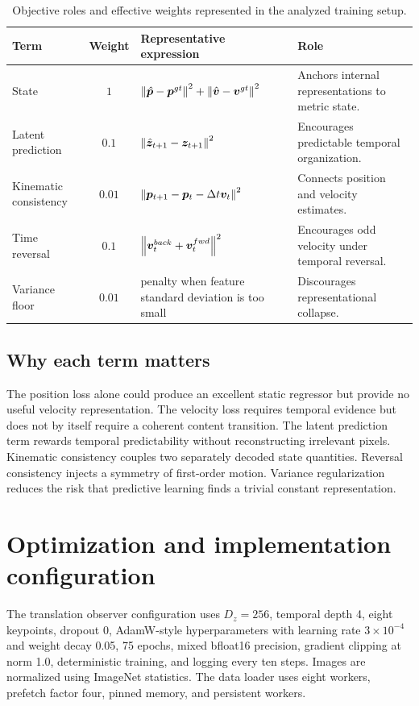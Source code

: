 \documentclass[11pt,a4paper]{article}
\begin{document}
\begin{table}\centering
\caption{Objective roles and effective weights represented in the analyzed training setup.}\label{tab:losses}
\begin{tabularx}{\textwidth}{lclX}\toprule
Term & Weight & Representative expression & Role \\\midrule
State & $1$ & $\left\lVert \hat{\bm p}-\bm p^{gt}\right\rVert^2+\left\lVert \hat{\bm v}-\bm v^{gt}\right\rVert^2$ & Anchors internal representations to metric state.\\
Latent prediction & $0.1$ & $\left\lVert \hat{\bm z}_{t+1}-\bm z_{t+1}\right\rVert^2$ & Encourages predictable temporal organization.\\
Kinematic consistency & $0.01$ & $\left\lVert \bm p_{t+1}-\bm p_t-\Delta t\bm v_t\right\rVert^2$ & Connects position and velocity estimates.\\
Time reversal & $0.1$ & $\left\lVert \bm v_t^{back}+\bm v_t^{fwd}\right\rVert^2$ & Encourages odd velocity under temporal reversal.\\
Variance floor & $0.01$ & penalty when feature standard deviation is too small & Discourages representational collapse.\\\bottomrule
\end{tabularx}
\end{table}

\subsection{Why each term matters}
The position loss alone could produce an excellent static regressor but provide no useful velocity representation. The velocity loss requires temporal evidence but does not by itself require a coherent content transition. The latent prediction term rewards temporal predictability without reconstructing irrelevant pixels. Kinematic consistency couples two separately decoded state quantities. Reversal consistency injects a symmetry of first-order motion. Variance regularization reduces the risk that predictive learning finds a trivial constant representation.

\section{Optimization and implementation configuration}
The translation observer configuration uses $D_z=256$, temporal depth 4, eight keypoints, dropout 0, AdamW-style hyperparameters with learning rate $3\times10^{-4}$ and weight decay 0.05, 75 epochs, mixed bfloat16 precision, gradient clipping at norm 1.0, deterministic training, and logging every ten steps. Images are normalized using ImageNet statistics. The data loader uses eight workers, prefetch factor four, pinned memory, and persistent workers.
\end{document}
